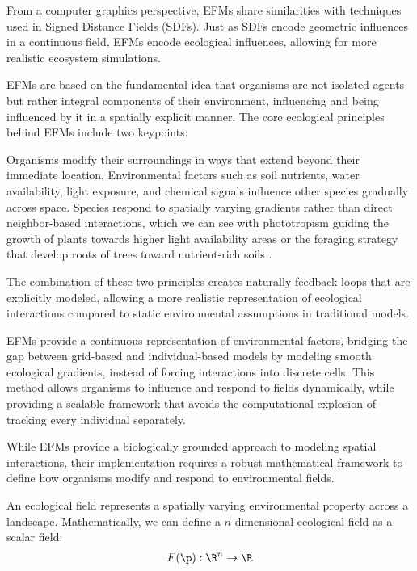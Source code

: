 From a computer graphics perspective, EFMs share similarities with techniques used in Signed Distance Fields (SDFs). Just as SDFs encode geometric influences in a continuous field, EFMs encode ecological influences, allowing for more realistic ecosystem simulations.

EFMs are based on the fundamental idea that organisms are not isolated agents but rather integral components of their environment, influencing and being influenced by it in a spatially explicit manner. The core ecological principles behind EFMs include two keypoints:
\begin{Itemize}
     Organisms modify their surroundings in ways that extend beyond their immediate location.    Environmental factors such as soil nutrients, water availability, light exposure, and chemical signals influence other species gradually across space.
     Species respond to spatially varying gradients rather than direct neighbor-based interactions, which we can see with phototropism guiding the growth of plants towards higher light availability areas \cite{Pirk2012} or the foraging strategy that develop roots of trees toward nutrient-rich soils \cite{Li2023}. 
\end{Itemize}

The combination of these two principles creates naturally feedback loops that are explicitly modeled, allowing a more realistic representation of ecological interactions compared to static environmental assumptions in traditional models.





EFMs provide a continuous representation of environmental factors, bridging the gap between grid-based and individual-based models by modeling smooth ecological gradients, instead of forcing interactions into discrete cells. This method allows organisms to influence and respond to fields dynamically, while providing a scalable framework that avoids the computational explosion of tracking every individual separately.


While EFMs provide a biologically grounded approach to modeling spatial interactions, their implementation requires a robust mathematical framework to define how organisms modify and respond to environmental fields. 





An ecological field represents a spatially varying environmental property across a landscape. Mathematically, we can define a $n$-dimensional ecological field as a scalar field:
\begin{align}
    F(\p) : \R^n \to \R
\end{align}

